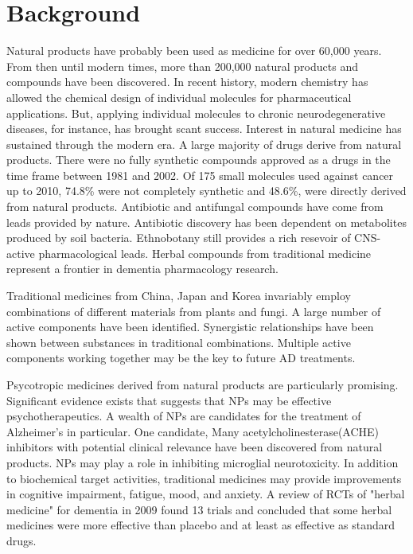 \documentclass[twocolumn]{article}
\begin{document}
\section{Background}

Natural products have probably been used as medicine for over 60,000 years.
From then until modern times,
more than 200,000 natural products and compounds have been discovered.
\cite{ji2009natural}
In recent history, modern chemistry has allowed the chemical design of
individual molecules for pharmaceutical applications.
But, applying individual molecules to chronic neurodegenerative diseases, for instance,
has brought scant success.
Interest in natural medicine has sustained through the modern era.
A large majority of drugs derive from natural products.
There were no
fully synthetic compounds
approved as a drugs in the time frame
between 1981 and 2002.
\cite{newman2003natural}
Of 175 small molecules used against cancer up to 2010,
74.8\% were not completely synthetic and
48.6\%, were directly derived from natural products.
\cite{newman2012natural}
Antibiotic and antifungal compounds have come from leads provided by nature.
Antibiotic discovery has been dependent on metabolites produced by soil bacteria.
\cite{laursen2004phenazine}
Ethnobotany still provides a rich resevoir of CNS-active pharmacological leads.
\cite{mcclatchey2009ethnobotany, perry1999medicinal}
Herbal compounds from traditional medicine represent a frontier
in dementia pharmacology research.
\cite{jesky2011herbal}

Traditional medicines from China, Japan and Korea invariably employ combinations
of different materials from plants and fungi.
A large number of active components have been identified.
\cite{gao2013research}
Synergistic relationships have been shown between substances
in traditional combinations.
Multiple active components working together may be the key
to future AD treatments.
\cite{kong2009hope, liu2014history}

Psycotropic medicines derived from natural products are particularly promising.
\cite{lake2000psychotropic}
Significant evidence exists that suggests that NPs
may be effective psychotherapeutics.
\cite{fugh1999dietary}
A wealth of NPs are candidates for the treatment of Alzheimer's in particular.
One candidate,
\cite{houghton2005natural}
Many acetylcholinesterase(ACHE) inhibitors with potential clinical relevance
have been discovered from natural products.
\cite{barbosa2006natural}
NPs may play a role in inhibiting microglial neurotoxicity.
\cite{choi2011inhibitors}
In addition to biochemical target activities,
traditional medicines may provide improvements in
cognitive impairment, fatigue, mood, and anxiety.
\cite{divino2011role}
A review of RCTs of "herbal medicine" for dementia in 2009 found
13 trials and concluded that some herbal medicines were more effective than
placebo and at least as effective as standard drugs.
\cite{may2009herbal}
\end{document}
